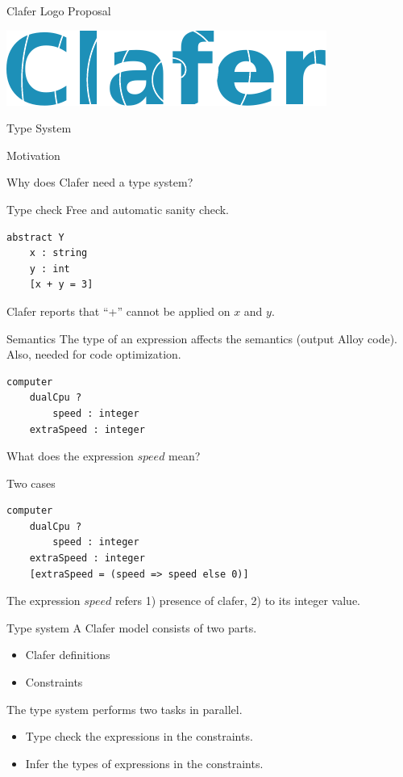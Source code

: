 \documentclass[table,15pt,t]{beamer}
\newcommand{\vmiddle}[1]{
  \vspace{\stretch{1}}
  #1
  \vspace{\stretch{1}}
}
\newcommand{\interframe}[1]{
\begin{frame}{}
\vmiddle{\hmiddle{\Huge #1}}
\end{frame}
}
\newcommand{\hmiddle}[1]{
  \begin{center}#1\end{center}
}
\begin{document}
\begin{frame}{Clafer Logo Proposal}
\vmiddle{\includegraphics[width=\textwidth]{figs/logo}}
\end{frame}

\interframe{Type System}

\begin{frame}{Motivation}
\vmiddle{Why does Clafer need a type system?}
\end{frame}

\begin{frame}[fragile,c]{Type check}
Free and automatic sanity check.
\vfill \begin{lstlisting}
abstract Y
    x : string
    y : int
    [x + y = 3]
\end{lstlisting}
Clafer reports that ``+'' cannot be applied on $x$ and $y$.
\end{frame}

\begin{frame}[fragile,c]{Semantics}
The type of an expression affects the semantics (output Alloy code). Also, needed for code optimization.
\vfill \begin{lstlisting}
computer
    dualCpu ?
        speed : integer
    extraSpeed : integer
\end{lstlisting}
What does the expression $speed$ mean?
\end{frame}

\begin{frame}[fragile,c]{Two cases}
\begin{lstlisting}
computer
    dualCpu ?
        speed : integer
    extraSpeed : integer
    [extraSpeed = (speed => speed else 0)]
\end{lstlisting}
The expression $speed$ refers 1) presence of clafer, 2) to its integer value.
\end{frame}

\begin{frame}[fragile,c]{Type system}
A Clafer model consists of two parts.
\begin{itemize}
\item Clafer definitions
\item Constraints
\end{itemize}

\vfill The type system performs two tasks in parallel.
\begin{itemize}
\item Type check the expressions in the constraints.
\item Infer the types of expressions in the constraints.
\end{itemize}
\end{frame}
\end{document}
